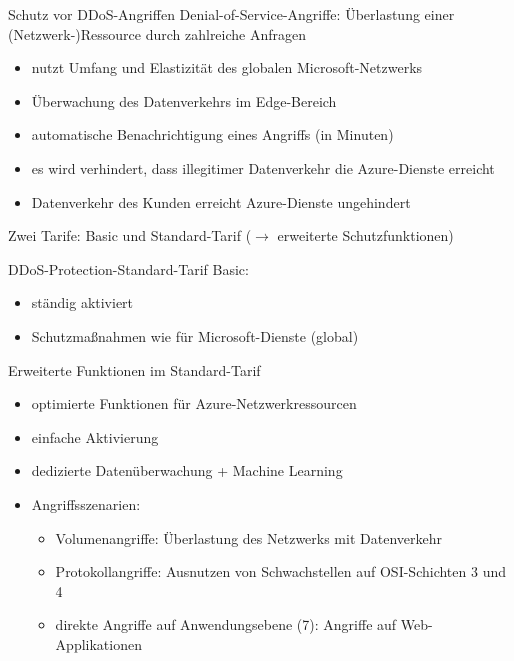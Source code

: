 \begin{flashcard}[Beschreibung]{Schutz vor DDoS-Angriffen}
    Denial-of-Service-Angriffe: Überlastung einer (Netzwerk-)Ressource durch zahlreiche Anfragen
    \begin{itemize}
        \item nutzt Umfang und Elastizität des globalen Microsoft-Netzwerks
        \item Überwachung des Datenverkehrs im Edge-Bereich
        \item automatische Benachrichtigung eines Angriffs (in Minuten)
        \item es wird verhindert, dass illegitimer Datenverkehr die Azure-Dienste erreicht
        \item Datenverkehr des Kunden erreicht Azure-Dienste ungehindert
    \end{itemize}
    Zwei Tarife: Basic und Standard-Tarif ($\rightarrow$ erweiterte Schutzfunktionen)
\end{flashcard}

\begin{flashcard}[Beschreibung]{DDoS-Protection-Standard-Tarif}
    Basic:
    \begin{itemize}
        \item ständig aktiviert
        \item Schutzmaßnahmen wie für Microsoft-Dienste (global)
    \end{itemize}

    Erweiterte Funktionen im Standard-Tarif
    \begin{itemize}
        \item optimierte Funktionen für Azure-Netzwerkressourcen
        \item einfache Aktivierung
        \item dedizierte Datenüberwachung + Machine Learning
        \item Angriffsszenarien:
        \begin{itemize}
            \item Volumenangriffe: Überlastung des Netzwerks mit Datenverkehr
            \item Protokollangriffe: Ausnutzen von Schwachstellen auf OSI-Schichten 3 und 4
            \item direkte Angriffe auf Anwendungsebene (7): Angriffe auf Web-Applikationen
        \end{itemize}

    \end{itemize}
\end{flashcard}

